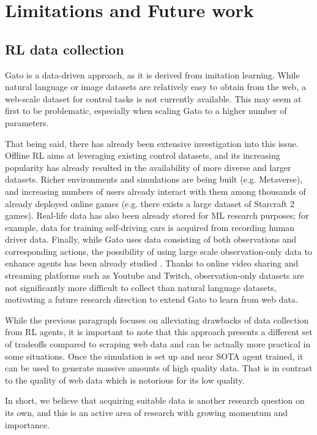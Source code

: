 \documentclass[10pt]{article} \usepackage[accepted]{tmlr}
\begin{document}
\section{Limitations and Future work}
\subsection{RL data collection}
\vskip 0.2cm
Gato is a data-driven approach, as it is derived from imitation learning. While natural language or image datasets are relatively easy to obtain from the web, a web-scale dataset for control tasks is not currently available.
This may seem at first to be problematic, especially when scaling Gato to a higher number of parameters.


That being said, there has already been extensive investigation into this issue.
Offline RL aims at leveraging existing control datasets, and its increasing popularity has already resulted in the availability of more diverse and larger datasets.
Richer environments and simulations are being built (e.g. Metaverse), and increasing numbers of users already interact with them among thousands of already deployed online games (e.g. there exists a large dataset of Starcraft 2 games).
Real-life data has also been already stored for ML research purposes; for example, data for training self-driving cars is acquired from recording human driver data.
Finally, while Gato uses data consisting of both observations and corresponding actions, the possibility of using large scale observation-only data to enhance agents has been already studied \citep{baker2022video}.
Thanks to online video sharing and streaming platforms such as Youtube and Twitch, observation-only datasets are not significantly more difficult to collect than natural language datasets, motivating a future research direction to extend Gato to learn from web data.


While the previous paragraph focuses on alleviating drawbacks of data collection from RL agents, it is important to note that this approach presents a different set of tradeoffs compared to scraping web data and can be actually more practical in some situations.
Once the simulation is set up and near SOTA agent trained, it can be used to generate massive amounts of high quality data.
That is in contrast to the quality of web data which is notorious for its low quality.


In short, we believe that acquiring suitable data is another research question on its own, and this is an active area of research with growing momentum and importance.
\vskip 0.4cm
\end{document}
